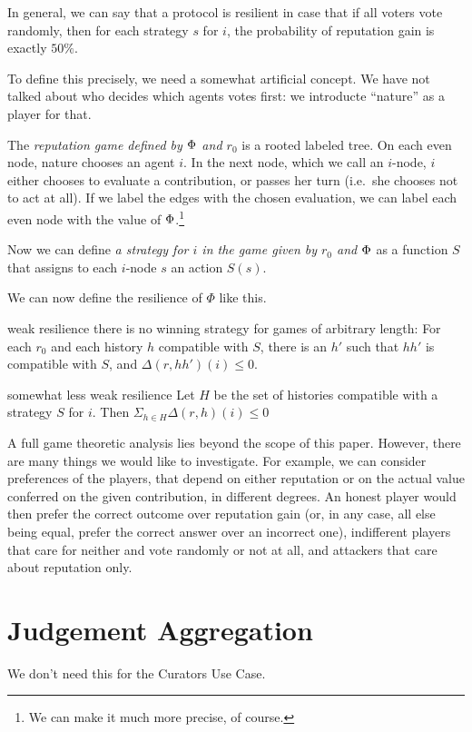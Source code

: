 \documentclass{article}
\begin{document}
In general, we can say that a protocol is resilient in case that if all voters vote randomly, then for each strategy $s$ for $i$, the probability of reputation gain is exactly $50\%$.

To define this precisely, we need a somewhat artificial concept. We have not talked about who decides which agents votes first: we introducte ``nature'' as a player for that.

The {\em reputation game defined by $\Phi$ and $r_0$} is a rooted labeled tree. On each even node, nature chooses an agent $i$. In the next node, which we call an $i$-node, $i$ either chooses to evaluate a contribution, or passes her turn (i.e.\ she chooses not to act at all). 
If we label the edges with the chosen evaluation, we can label each even node with the value of $\Phi$.\footnote{We can make it much more precise, of course.}

Now we can define {\em a strategy for $i$ in the game given by $r_0$ and $\Phi$} as a function $S$ that assigns to each $i$-node $s$ an action $S(s)$.

We can now define the resilience of $\Phi$ like this. 

\begin{condition}{weak resilience} 
there is no winning strategy for games of arbitrary length: For each $r_0$ and each history $h$ compatible with $S$, there is an $h'$ such that $hh'$ is compatible with $S$, and $\Delta(r, hh')(i) \leq 0$.
\end{condition}
\begin{condition}{somewhat less weak resilience} 
Let $H$ be the set of histories compatible with a strategy $S$ for $i$. Then $\Sigma_{h\in H} \Delta(r, h)(i) \leq 0$
\end{condition}
A full game theoretic analysis lies beyond the scope of this paper. However, there are many things we would like to investigate. For example, we can consider preferences of the players, that depend on either reputation or on the actual value conferred on the given contribution, in different degrees. An honest player would then prefer the correct outcome over reputation gain (or, in any case, all else being equal, prefer the correct answer over an incorrect one), indifferent players that care for neither and vote randomly or not at all, and attackers that care about reputation only. 

\section{Judgement Aggregation}
We don't need this for the Curators Use Case.
\end{document}
